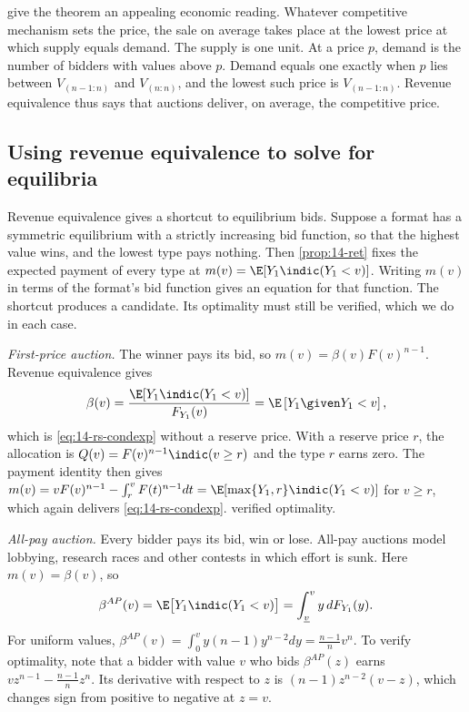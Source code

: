  give the theorem an appealing economic reading. Whatever competitive mechanism sets the price, the sale on average takes place at the lowest price at which supply equals demand. The supply is one unit. At a price $p$, demand is the number of bidders with values above $p$. Demand equals one exactly when $p$ lies between $V_{(n-1:n)}$ and $V_{(n:n)}$, and the lowest such price is $V_{(n-1:n)}$. Revenue equivalence thus says that auctions deliver, on average, the competitive price.

\subsection{Using revenue equivalence to solve for equilibria}\label{sec:14-ret-solve}

Revenue equivalence gives a shortcut to equilibrium bids. Suppose a format has a symmetric equilibrium with a strictly increasing bid function, so that the highest value wins, and the lowest type pays nothing. Then \cref{prop:14-ret} fixes the expected payment of every type at $m(v)=\E[Y_1\indic(Y_1<v)]$. Writing $m(v)$ in terms of the format's bid function gives an equation for that function. The shortcut produces a candidate. Its optimality must still be verified, which we do in each case.

\emph{First-price auction.} The winner pays its bid, so $m(v)=\beta(v)F(v)^{n-1}$. Revenue equivalence gives
\[
\beta(v)=\frac{\E[Y_1\indic(Y_1<v)]}{F_{Y_1}(v)}=\E\left[Y_1\given Y_1<v\right],
\]
which is \eqref{eq:14-rs-condexp} without a reserve price. With a reserve price $r$, the allocation is $Q(v)=F(v)^{n-1}\indic(v\ge r)$ and the type $r$ earns zero. The payment identity then gives $m(v)=vF(v)^{n-1}-\int_r^vF(t)^{n-1}dt=\E[\max\{Y_1,r\}\indic(Y_1<v)]$ for $v\ge r$, which again delivers \eqref{eq:14-rs-condexp}.  verified optimality.

\emph{All-pay auction.} Every bidder pays its bid, win or lose. All-pay auctions model lobbying, research races and other contests in which effort is sunk. Here $m(v)=\beta(v)$, so
\[
\beta^{AP}(v)=\E\big[Y_1\indic(Y_1<v)\big]=\int_{\underline v}^v y\,dF_{Y_1}(y).
\]
For uniform values, $\beta^{AP}(v)=\int_0^v y(n-1)y^{n-2}dy=\frac{n-1}{n}v^n$. To verify optimality, note that a bidder with value $v$ who bids $\beta^{AP}(z)$ earns $vz^{n-1}-\frac{n-1}{n}z^n$. Its derivative with respect to $z$ is $(n-1)z^{n-2}(v-z)$, which changes sign from positive to negative at $z=v$.

